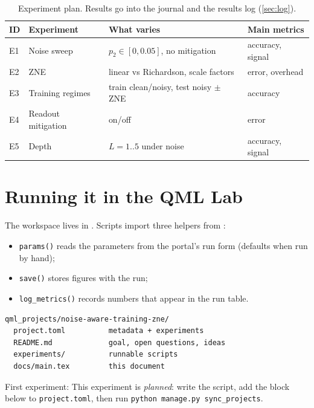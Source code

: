 \documentclass[11pt,a4paper]{article}
\begin{document}
\begin{table}[h]
\centering\small
\begin{tabularx}{\linewidth}{@{}l>{\raggedright}X>{\raggedright}X>{\raggedright\arraybackslash}X@{}}
\toprule
ID & Experiment & What varies & Main metrics \\
\midrule
  E1 & Noise sweep & $p_2\in[0,0.05]$, no mitigation & accuracy, signal \\
  E2 & ZNE & linear vs Richardson, scale factors & error, overhead \\
  E3 & Training regimes & train clean/noisy, test noisy $\pm$ ZNE & accuracy \\
  E4 & Readout mitigation & on/off & error \\
  E5 & Depth & $L=1..5$ under noise & accuracy, signal \\
\bottomrule
\end{tabularx}
\caption{Experiment plan. Results go into the journal and the results log (\cref{sec:log}).}
\end{table}

\section{Running it in the QML Lab}
The workspace lives in . Scripts import three helpers from
:
\begin{itemize}
  \item \texttt{params()} reads the parameters from the portal's run form (defaults when run by hand);
  \item \texttt{save()} stores figures with the run;
  \item \texttt{log\_metrics()} records numbers that appear in the run table.
\end{itemize}

\begin{lstlisting}
qml_projects/noise-aware-training-zne/
  project.toml          metadata + experiments
  README.md             goal, open questions, ideas
  experiments/          runnable scripts
  docs/main.tex         this document
\end{lstlisting}

First experiment: This experiment is \emph{planned}: write the script, add the block below to \texttt{project.toml}, then run \texttt{python manage.py sync\_projects}.
\end{document}
